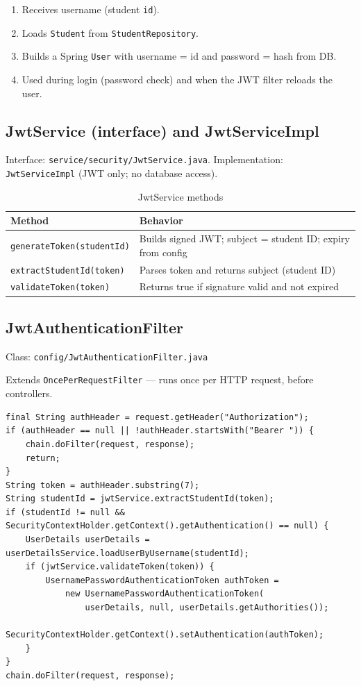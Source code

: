 \documentclass[11pt,a4paper]{article}
\begin{document}
\begin{enumerate}[noitemsep]
    \item Receives username (student \texttt{id}).
    \item Loads \texttt{Student} from \texttt{StudentRepository}.
    \item Builds a Spring \texttt{User} with username = id and password = hash from DB.
    \item Used during login (password check) and when the JWT filter reloads the user.
\end{enumerate}

\subsection{JwtService (interface) and JwtServiceImpl}

Interface: \texttt{service/security/JwtService.java}. Implementation: \texttt{JwtServiceImpl} (JWT only; no database access).

\begin{table}[h]
\centering
\begin{tabular}{@{}lp{8cm}@{}}
\toprule
\textbf{Method} & \textbf{Behavior} \\
\midrule
\texttt{generateToken(studentId)}  & Builds signed JWT; subject = student ID; expiry from config \\
\texttt{extractStudentId(token)}   & Parses token and returns subject (student ID) \\
\texttt{validateToken(token)}      & Returns true if signature valid and not expired \\
\bottomrule
\end{tabular}
\caption{JwtService methods}
\end{table}

\subsection{JwtAuthenticationFilter}

Class: \texttt{config/JwtAuthenticationFilter.java}

Extends \texttt{OncePerRequestFilter} --- runs once per HTTP request, before controllers.

\begin{lstlisting}[style=javacode, caption={JWT filter logic (excerpt)}]
final String authHeader = request.getHeader("Authorization");
if (authHeader == null || !authHeader.startsWith("Bearer ")) {
    chain.doFilter(request, response);
    return;
}
String token = authHeader.substring(7);
String studentId = jwtService.extractStudentId(token);
if (studentId != null && SecurityContextHolder.getContext().getAuthentication() == null) {
    UserDetails userDetails = userDetailsService.loadUserByUsername(studentId);
    if (jwtService.validateToken(token)) {
        UsernamePasswordAuthenticationToken authToken =
            new UsernamePasswordAuthenticationToken(
                userDetails, null, userDetails.getAuthorities());
        SecurityContextHolder.getContext().setAuthentication(authToken);
    }
}
chain.doFilter(request, response);
\end{lstlisting}
\end{document}
